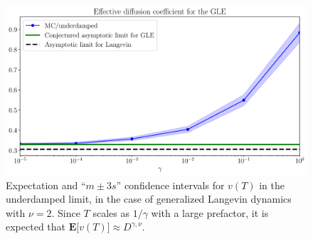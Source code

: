 \documentclass[11pt,a4paper]{article}
\newcommand{\expect}[0]{\mathbf{E}}
\theoremstyle{plain}
\numberwithin{equation}{section}
\begin{document}
\begin{figure}[ht]
    \centering
    \includegraphics[width=0.75\linewidth]{figures/mobility_gle.pdf}
    \caption{%
        Expectation and ``$m \pm 3 s$'' confidence intervals for $v(T)$ in the underdamped limit,
        in the case of generalized Langevin dynamics with $\nu = 2$.
        Since $T$ scales as $1/\gamma$ with a large prefactor,
        it is expected that $\expect \bigl[ v(T) \bigr] \approx D^{\gamma,\nu}$.
    }
    \label{fig:effective_diffusion_gle}
\end{figure}


\end{document}
